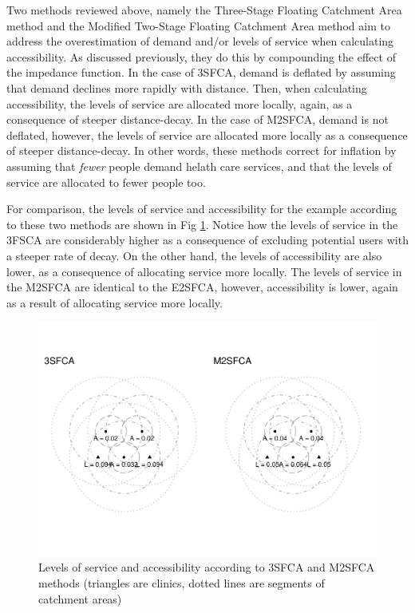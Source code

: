 \documentclass[10pt,letterpaper]{article}
\begin{document}
Two methods reviewed above, namely the Three-Stage Floating Catchment
Area method and the Modified Two-Stage Floating Catchment Area method
aim to address the overestimation of demand and/or levels of service
when calculating accessibility. As discussed previously, they do this by
compounding the effect of the impedance function. In the case of 3SFCA,
demand is deflated by assuming that demand declines more rapidly with
distance. Then, when calculating accessibility, the levels of service
are allocated more locally, again, as a consequence of steeper
distance-decay. In the case of M2SFCA, demand is not deflated, however,
the levels of service are allocated more locally as a consequence of
steeper distance-decay. In other words, these methods correct for
inflation by assuming that \emph{fewer} people demand helath care
services, and that the levels of service are allocated to fewer people
too.

For comparison, the levels of service and accessibility for the example
according to these two methods are shown in Fig
\ref{fig:fig5-example-5}. Notice how the levels of service in the 3FSCA
are considerably higher as a consequence of excluding potential users
with a steeper rate of decay. On the other hand, the levels of
accessibility are also lower, as a consequence of allocating service
more locally. The levels of service in the M2SFCA are identical to the
E2SFCA, however, accessibility is lower, again as a result of allocating
service more locally.

\begin{figure}
\includegraphics[width=0.95\linewidth]{Supply_and_Demand_Inflation_in_FCA_Methods_v2.0_files/figure-latex/fig5-example-5-1} \caption{\label{fig:fig5-example-5}Levels of service and accessibility according to 3SFCA and M2SFCA methods (triangles are clinics, dotted lines are segments of catchment areas)}\label{fig:fig5-example-5}
\end{figure}
\end{document}

